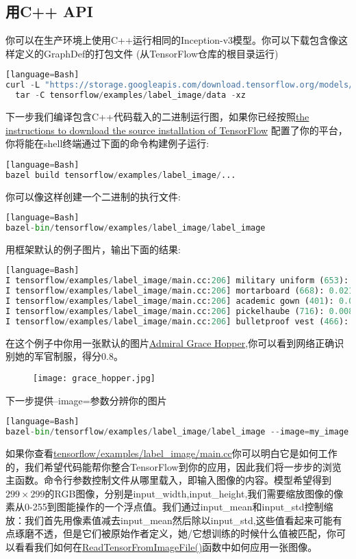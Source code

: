 \subsection{用C++ API}
你可以在生产环境上使用C++运行相同的Inception-v3模型。你可以下载包含像这样定义的GraphDef的打包文件
(从TensorFlow仓库的根目录运行)
\begin{lstlisting}[language=Python][language=Bash]
curl -L "https://storage.googleapis.com/download.tensorflow.org/models/inception_v3_2016_08_28_frozen.pb.tar.gz" |
  tar -C tensorflow/examples/label_image/data -xz
\end{lstlisting}
下一步我们编译包含C++代码载入的二进制运行图，如果你已经按照\href{https://www.tensorflow.org/install/install_sources}{the instructions to download the source installation of TensorFlow}
配置了你的平台，你将能在shell终端通过下面的命令构建例子运行:
\begin{lstlisting}[language=Python][language=Bash]
bazel build tensorflow/examples/label_image/...
\end{lstlisting}
你可以像这样创建一个二进制的执行文件:
\begin{lstlisting}[language=Python][language=Bash]
bazel-bin/tensorflow/examples/label_image/label_image
\end{lstlisting}
用框架默认的例子图片，输出下面的结果:
\begin{lstlisting}[language=Python][language=Bash]
I tensorflow/examples/label_image/main.cc:206] military uniform (653): 0.834306
I tensorflow/examples/label_image/main.cc:206] mortarboard (668): 0.0218692
I tensorflow/examples/label_image/main.cc:206] academic gown (401): 0.0103579
I tensorflow/examples/label_image/main.cc:206] pickelhaube (716): 0.00800814
I tensorflow/examples/label_image/main.cc:206] bulletproof vest (466): 0.00535088
\end{lstlisting}
在这个例子中你用一张默认的图片\href{https://en.wikipedia.org/wiki/Grace_Hopper}{Admiral Grace Hopper},你可以看到网络正确识别她的军官制服，得分0.8。
\begin{center}
\begin{figure}[H]
\centering
\texttt{[image: grace\_hopper.jpg]}
\end{figure}
\end{center}
下一步提供--image=参数分辨你的图片
\begin{lstlisting}[language=Python][language=Bash]
bazel-bin/tensorflow/examples/label_image/label_image --image=my_image.png
\end{lstlisting}
如果你查看\href{https://github.com/tensorflow/tensorflow/blob/master/tensorflow/examples/label_image/main.cc}{tensorflow/examples/label\_image/main.cc}你可以明白它是如何工作的，我们希望代码能帮你整合TensorFlow到你的应用，因此我们将一步步的浏览主函数。命令行参数控制文件从哪里载入，即输入图像的内容。模型希望得到$299\times299$的RGB图像，分别是input\_width,input\_height,我们需要缩放图像的像素从0-255到图能操作的一个浮点值。我们通过input\_mean和input\_std控制缩放：我们首先用像素值减去input\_mean然后除以input\_std,这些值看起来可能有点琢磨不透，但是它们被原始作者定义，她/它想训练的时候什么值被匹配，你可以看看我们如何在\href{https://github.com/tensorflow/tensorflow/blob/master/tensorflow/examples/label_image/main.cc#L88}{ReadTensorFromImageFile()}函数中如何应用一张图像。
